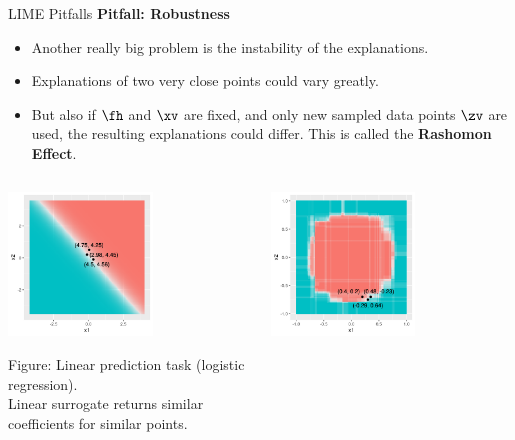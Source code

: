 \documentclass[11pt,compress,t,notes=noshow, xcolor=table]{beamer}
\begin{document}
\begin{vbframe}{LIME Pitfalls}
\textbf{Pitfall: Robustness}
\begin{itemize}
	\item Another really big problem is the instability of the explanations. 
	\item Explanations of two very close points could vary greatly. 
	\item But also if $\fh$ and $\xv$ are fixed, and only new sampled data points $\zv$ are used, the resulting explanations could differ. This is called the \textbf{Rashomon Effect}.
\end{itemize}
\vspace{-0.7cm}
\begin{columns}
	\begin{column}{0.48\textwidth}
		\begin{center}
		
		\includegraphics[width=0.6\textwidth]{figure/lime_robustness_1.png}
		
		\tiny{Figure: Linear prediction task (logistic regression). \\Linear surrogate returns similar coefficients for similar points.}
		
		\end{center}
	\end{column}
	\begin{column}{0.48\textwidth}
		\begin{center}
	\includegraphics[width=0.6\textwidth]{figure/lime_robustness_2.png}
	

\end{center}
\end{column}
\end{columns}
\end{vbframe}
\end{document}
